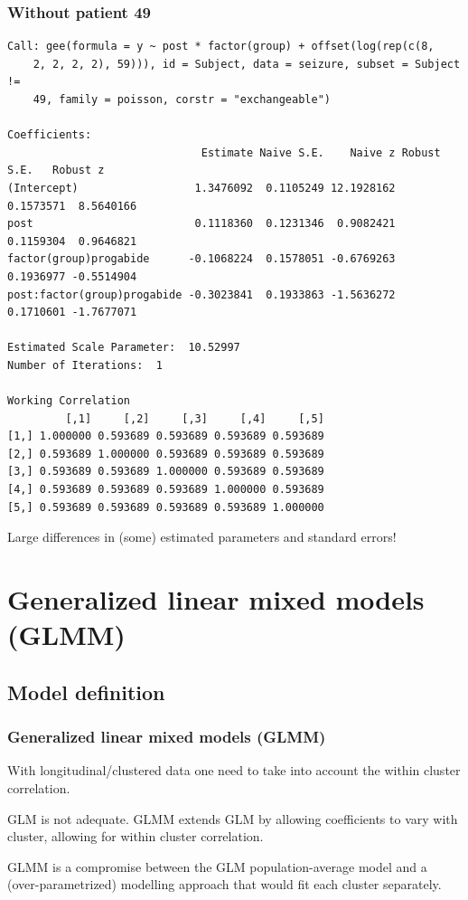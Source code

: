 \documentclass{beamer}
\newcommand{\bs}{\bigskip}
\begin{document}
\begin{frame}[fragile]
\frametitle{Without patient 49}
{\tiny
\begin{verbatim}
Call: gee(formula = y ~ post * factor(group) + offset(log(rep(c(8, 
    2, 2, 2, 2), 59))), id = Subject, data = seizure, subset = Subject != 
    49, family = poisson, corstr = "exchangeable")

Coefficients:
                              Estimate Naive S.E.    Naive z Robust S.E.   Robust z
(Intercept)                  1.3476092  0.1105249 12.1928162   0.1573571  8.5640166
post                         0.1118360  0.1231346  0.9082421   0.1159304  0.9646821
factor(group)progabide      -0.1068224  0.1578051 -0.6769263   0.1936977 -0.5514904
post:factor(group)progabide -0.3023841  0.1933863 -1.5636272   0.1710601 -1.7677071

Estimated Scale Parameter:  10.52997
Number of Iterations:  1

Working Correlation
         [,1]     [,2]     [,3]     [,4]     [,5]
[1,] 1.000000 0.593689 0.593689 0.593689 0.593689
[2,] 0.593689 1.000000 0.593689 0.593689 0.593689
[3,] 0.593689 0.593689 1.000000 0.593689 0.593689
[4,] 0.593689 0.593689 0.593689 1.000000 0.593689
[5,] 0.593689 0.593689 0.593689 0.593689 1.000000
\end{verbatim}
}

Large differences in (some) estimated parameters and standard
errors!
\end{frame}

\section{Generalized linear mixed models (GLMM)}
\label{GLMM.section}

\subsection{Model definition}
\begin{frame}
\frametitle{Generalized linear mixed models (GLMM)}
With longitudinal/clustered data one need to take into account the within
cluster correlation. 

\bs 

GLM is not adequate. GLMM extends GLM by allowing coefficients to vary with
cluster, allowing for within cluster correlation.

\bs
GLMM is a compromise between the GLM population-average model and a
(over-pa\-ra\-metrized) modelling approach that would fit each cluster separately.
\end{frame}
\end{document}
